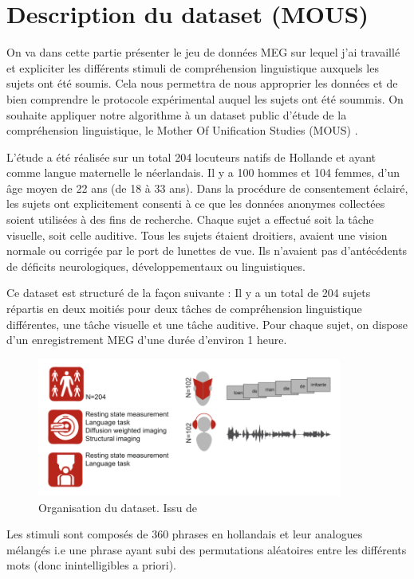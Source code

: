 \chapter{Description du dataset (MOUS)}

On va dans cette partie présenter le jeu de données MEG sur lequel j'ai travaillé et expliciter les différents stimuli de compréhension linguistique auxquels les sujets ont été soumis. Cela nous permettra de nous approprier les données et de bien comprendre le protocole expérimental auquel les sujets ont été soummis. 
On souhaite appliquer notre algorithme à un dataset public d'étude de la compréhension linguistique, le Mother Of Unification Studies (MOUS) \cite{4}. 

L'étude a été réalisée sur un total 204 locuteurs natifs de Hollande et ayant comme langue maternelle le néerlandais. Il y a 100 hommes et 104 femmes, d'un âge moyen de 22 ans (de 18 à 33 ans). Dans la procédure de consentement éclairé, les sujets ont explicitement consenti à ce que les données anonymes collectées soient utilisées à des fins de recherche. Chaque sujet a effectué soit la tâche visuelle, soit celle auditive. Tous les sujets étaient droitiers, avaient une vision normale ou corrigée par le port de lunettes de vue. Ils n'avaient pas d'antécédents de déficits neurologiques, développementaux ou linguistiques. 

\vspace{2mm}
Ce dataset est structuré de la façon suivante : 
Il y a un total de 204 sujets répartis en deux moitiés pour deux tâches de compréhension linguistique différentes, une tâche visuelle et une tâche auditive. Pour chaque sujet, on dispose d'un enregistrement MEG d'une durée d'environ 1 heure.

\begin{figure}[!ht]
    \centering
    \includegraphics[width=10cm]{orga_dataset.png}
    \caption{Organisation du dataset. Issu de \cite{4}}
    \label{fig2.1}
\end{figure}

Les stimuli sont composés de 360 phrases en hollandais et leur analogues mélangés i.e une phrase ayant subi des permutations aléatoires entre les différents mots (donc inintelligibles a priori).

